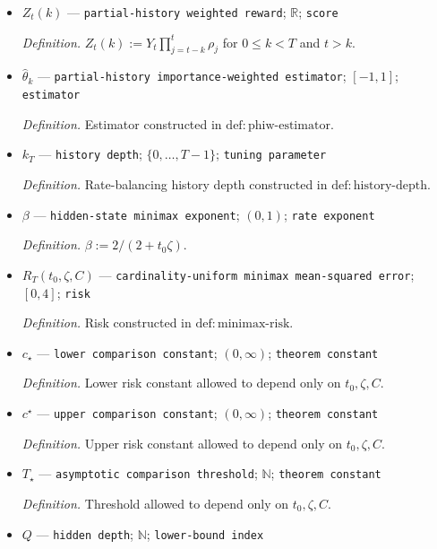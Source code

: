 \documentclass{article}
\begin{document}
\begin{itemize}
  \par\smallskip\noindent\emph{Definition.} \(\rho_t:=e(A_t\mid X_t)/b(A_t\mid X_t)\) on behavior-supported cells, with value zero on cells where both probabilities vanish.
  \item \(Z_t(k)\) --- \texttt{partial-\allowbreak{}history weighted reward}; \(\mathbb R\); \texttt{score}
  \par\smallskip\noindent\emph{Definition.} \(Z_t(k):=Y_t\prod_{j=t-k}^{t}\rho_j\) for \(0\le k<T\) and \(t>k\).
  \item \(\widehat\theta_k\) --- \texttt{partial-\allowbreak{}history importance-\allowbreak{}weighted estimator}; \([-1,1]\); \texttt{estimator}
  \par\smallskip\noindent\emph{Definition.} Estimator constructed in \(\mathrm{def{:}phiw\text{-}estimator}\).
  \item \(k_T\) --- \texttt{history depth}; \(\{0,\ldots,T-1\}\); \texttt{tuning parameter}
  \par\smallskip\noindent\emph{Definition.} Rate-balancing history depth constructed in \(\mathrm{def{:}history\text{-}depth}\).
  \item \(\beta\) --- \texttt{hidden-\allowbreak{}state minimax exponent}; \((0,1)\); \texttt{rate exponent}
  \par\smallskip\noindent\emph{Definition.} \(\beta:=2/(2+t_0\zeta)\).
  \item \(R_T(t_0,\zeta,C)\) --- \texttt{cardinality-\allowbreak{}uniform minimax mean-\allowbreak{}squared error}; \([0,4]\); \texttt{risk}
  \par\smallskip\noindent\emph{Definition.} Risk constructed in \(\mathrm{def{:}minimax\text{-}risk}\).
  \item \(c_\star\) --- \texttt{lower comparison constant}; \((0,\infty)\); \texttt{theorem constant}
  \par\smallskip\noindent\emph{Definition.} Lower risk constant allowed to depend only on \(t_0,\zeta,C\).
  \item \(c^\star\) --- \texttt{upper comparison constant}; \((0,\infty)\); \texttt{theorem constant}
  \par\smallskip\noindent\emph{Definition.} Upper risk constant allowed to depend only on \(t_0,\zeta,C\).
  \item \(T_\star\) --- \texttt{asymptotic comparison threshold}; \(\mathbb N\); \texttt{theorem constant}
  \par\smallskip\noindent\emph{Definition.} Threshold allowed to depend only on \(t_0,\zeta,C\).
  \item \(Q\) --- \texttt{hidden depth}; \(\mathbb N\); \texttt{lower-\allowbreak{}bound index}

\end{itemize}
\end{document}
